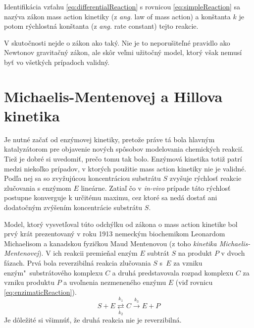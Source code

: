 \documentclass[11pt,final,oneside]{fithesis}
\begin{document}
Identifik\'acia vz\v tahu \ref{eq:differentialReaction} s rovnicou \ref{eq:simpleReaction} sa naz\'yva z\'akon mass action kinetiky (z \textit{ang.} law of mass action) a kon\v stanta $k$ 
je potom r\'ychlostn\'a kon\v stanta (z \textit{ang.} rate constant) tejto reakcie.

V skuto\v cnosti nejde o z\'akon ako tak\'y. Nie je to neporu\v site\v ln\'e pravidlo ako Newtonov gravita\v cn\'y z\'akon, ale sk\^ or ve\v lmi 
u\v zito\v cn\'y model, ktor\'y v\v sak nemus\'i by\v t vo v\v setk\'ych pr\'ipadoch validn\'y. \cite{Keener:1998:MP:MassAction}

\section{Michaelis-Mentenovej a Hillova kinetika}
\label{kinetiky}
Je nutn\'e za\v ca\v t od enz\'ymovej kinetiky, preto\v ze pr\'ave t\'a bola hlavn\'ym kataly\-z\'atorom pre objavenie nov\'ych sp\^ osobov modelovania 
chemick\'ych reakci\'i. Tie\v z je dobr\'e si uvedomi\v t, pre\v co tomu tak bolo. Enz\'ymov\'a kinetika toti\v z patr\'i medzi nieko\v lko pr\'ipadov, 
v ktor\'ych pou\v zitie mass action kinetiky nie je validn\'e. Pod\v la nej sa so zvy\v zuj\'ucou koncentr\'aciou substr\'atu $S$ zvy\v suje r\'ychlos\v t
reakcie zlu\v covania s enz\'ymom $E$ line\'arne. Zatia\v l \v co v \textit{in-vivo} pr\'ipade t\'ato r\'ychlos\v t postupne konverguje k ur\v cit\'emu 
maximu, cez ktor\'e sa ned\'a dosta\v t ani dodato\v cn\'ym zv\'y\v sen\'im koncentr\'acie substr\'atu $S$.

Model, ktor\'y vysvet\v loval t\'uto odch\'ylku od z\'akona o mass action kinetike bol prv\'y kr\'at prezentovan\'y v roku 1913 nemeck\'ym biochemikom Leonardom 
Michaelisom a kanadskou fyzi\v ckou Maud Mentenovou (z toho \textit{kinetika Michaelis-Mentenovej}). V ich reakcii premie\v nal enz\'ym $E$ subtr\'at $S$ 
na produkt $P$ v dvoch f\'azach. Prv\'a bola reverzibiln\'a reakcia zlu\v covania $S$ s~$E$ za vzniku enz\'ym"~substr\'atov\'eho komplexu $C$ a druh\'a 
predstavovala rozpad komplexu $C$ za vzniku produktu $P$ a uvo\v lnenia nezmenen\'eho enz\'ymu $E$ (vi\v d rovnicu \ref{eq:enzimaticReaction}).
\begin{equation}
\label{eq:enzimaticReaction}
S + E \underset{k_2}{\overset{k_1}{\rightleftarrows}} C \overset{k_3}{\longrightarrow} E + P
\end{equation}
Je d\^ ole\v zit\'e si v\v simn\'u\v t, \v ze druh\'a reakcia nie je reverzibiln\'a.
\end{document}

